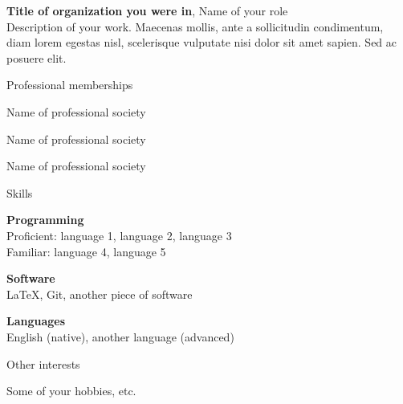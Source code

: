 \documentclass[letterpaper, 10pt]{article}
\newcommand{\heading}[1]{{\large\color{Mahogany} #1}\medskip}
\begin{document}
\textbf{Title of organization you were in}, Name of your role \\
Description of your work. Maecenas mollis, ante a sollicitudin condimentum, diam lorem egestas nisl, scelerisque vulputate nisi dolor sit amet sapien. Sed ac posuere elit.

\bigskip\bigskip


\heading{Professional memberships}

Name of professional society

Name of professional society

Name of professional society

\bigskip\bigskip


\heading{Skills}

\textbf{Programming} \\
Proficient: language 1, language 2, language 3 \\
Familiar: language 4, language 5 \medskip

\textbf{Software} \\
\LaTeX, Git, another piece of software \medskip

\textbf{Languages} \\
English (native), another language (advanced)

\bigskip\bigskip


\heading{Other interests}

Some of your hobbies, etc.

\end{document}
